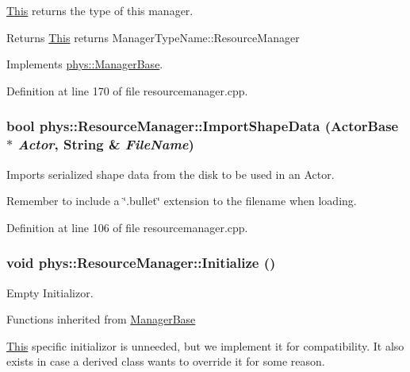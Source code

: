 \hyperlink{structThis}{This} returns the type of this manager. 

\begin{DoxyReturn}{Returns}
\hyperlink{structThis}{This} returns ManagerTypeName::ResourceManager 
\end{DoxyReturn}


Implements \hyperlink{classphys_1_1ManagerBase_aff400b6599db635e24796d8221e9a0e3}{phys::ManagerBase}.



Definition at line 170 of file resourcemanager.cpp.

\hypertarget{classphys_1_1ResourceManager_a98cee7034bdf66a5cca1de8ade33139d}{
\subsubsection[{ImportShapeData}]{\setlength{\rightskip}{0pt plus 5cm}bool phys::ResourceManager::ImportShapeData ({\bf ActorBase} $\ast$ {\em Actor}, \/  {\bf String} \& {\em FileName})}}
\label{d1/d35/classphys_1_1ResourceManager_a98cee7034bdf66a5cca1de8ade33139d}


Imports serialized shape data from the disk to be used in an Actor. 

Remember to include a \char`\"{}.bullet\char`\"{} extension to the filename when loading. 

Definition at line 106 of file resourcemanager.cpp.

\hypertarget{classphys_1_1ResourceManager_a9be3250f1f1153c9e079f82736eb00a8}{
\subsubsection[{Initialize}]{\setlength{\rightskip}{0pt plus 5cm}void phys::ResourceManager::Initialize ()}}
\label{d1/d35/classphys_1_1ResourceManager_a9be3250f1f1153c9e079f82736eb00a8}


Empty Initializor. 

Functions inherited from \hyperlink{classphys_1_1ManagerBase}{ManagerBase}

\hyperlink{structThis}{This} specific initializor is unneeded, but we implement it for compatibility. It also exists in case a derived class wants to override it for some reason. 

